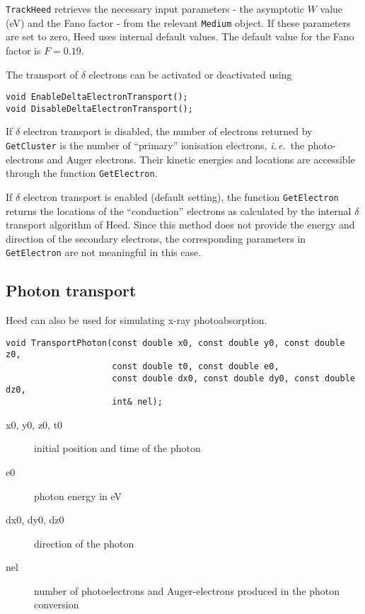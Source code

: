 \texttt{TrackHeed} retrieves the necessary input parameters - the 
asymptotic \(W\) value (eV) and the Fano factor - 
from the relevant \texttt{Medium} object. 
If these parameters are set to zero, Heed uses internal default values. 
The default value for the Fano factor is \(F = 0.19\).

The transport of \(\delta\) electrons can be activated or deactivated 
using
\begin{lstlisting}
void EnableDeltaElectronTransport();
void DisableDeltaElectronTransport();
\end{lstlisting} 

If \(\delta\) electron transport is disabled, 
the number of electrons returned by \texttt{GetCluster} is 
the number of ``primary'' ionisation electrons, 
\textit{i.\,e.}~the photo-electrons and Auger electrons. 
Their kinetic energies and locations are accessible 
through the function \texttt{GetElectron}.

If \(\delta\) electron transport is enabled (default setting), 
the function \texttt{GetElectron} returns the 
locations of the ``conduction'' electrons as calculated by the 
internal \(\delta\) transport algorithm of Heed. 
Since this method does not provide the energy and direction of the 
secondary electrons, the corresponding parameters in 
\texttt{GetElectron} are not meaningful in this case. 

\subsection{Photon transport}

Heed can also be used for simulating x-ray photoabsorption. 
\begin{lstlisting}
void TransportPhoton(const double x0, const double y0, const double z0,
                     const double t0, const double e0,
                     const double dx0, const double dy0, const double dz0,
                     int& nel);
\end{lstlisting}
\begin{description}
\item[x0, y0, z0, t0] initial position and time of the photon
\item[e0] photon energy in eV
\item[dx0, dy0, dz0] direction of the photon
\item[nel] number of photoelectrons and Auger-electrons produced 
           in the photon conversion
\end{description}

